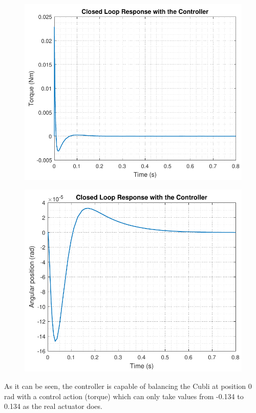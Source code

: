 \begin{minipage}{\linewidth}
	\begin{minipage}{0.45\linewidth}
		\begin{figure}[H]
			\includegraphics[scale=.56]{figures/TorqueResponse}
			\centering
			\captionsetup{justification=centering}
			\label{TorqueResponse}
		\end{figure}
	\end{minipage}
	\hspace{0.03\linewidth}
	\begin{minipage}{0.45\linewidth}
		\begin{figure}[H]
			\includegraphics[scale=.56]{figures/PositionResponse}
			\centering
			\captionsetup{justification=centering}
			\label{PositionResponse}
		\end{figure}
	\end{minipage}
\end{minipage}

As it can be seen, the controller is capable of balancing the Cubli at position 0 rad with a control action (torque) which can only take values from -0.134 to 0.134 as the real actuator does.